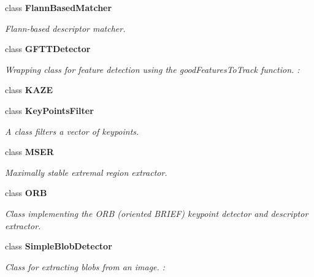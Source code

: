 \begin{DoxyCompactItemize}
class {\bfseries Flann\+Based\+Matcher}
\begin{DoxyCompactList}\small\item\em Flann-\/based descriptor matcher. \end{DoxyCompactList}\item 
class {\bfseries G\+F\+T\+T\+Detector}
\begin{DoxyCompactList}\small\item\em Wrapping class for feature detection using the good\+Features\+To\+Track function. \+: \end{DoxyCompactList}\item 
class {\bfseries K\+A\+ZE}
\item 
class {\bfseries Key\+Points\+Filter}
\begin{DoxyCompactList}\small\item\em A class filters a vector of keypoints. \end{DoxyCompactList}\item 
class {\bfseries M\+S\+ER}
\begin{DoxyCompactList}\small\item\em Maximally stable extremal region extractor. \end{DoxyCompactList}\item 
class {\bfseries O\+RB}
\begin{DoxyCompactList}\small\item\em Class implementing the O\+RB ({\itshape oriented B\+R\+I\+EF}) keypoint detector and descriptor extractor. \end{DoxyCompactList}\item 
class {\bfseries Simple\+Blob\+Detector}
\begin{DoxyCompactList}\small\item\em Class for extracting blobs from an image. \+: \end{DoxyCompactList}\end{DoxyCompactItemize}
